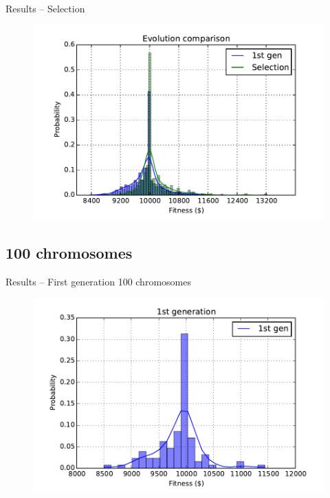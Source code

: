 \documentclass[12pt,portuguese]{beamer}
\begin{document}
\begin{frame}{Results -- Selection}
	\begin{figure}[h]
	\centering
	\includegraphics[width=0.9\columnwidth]{images/01r_1000_sel.pdf}
	\end{figure}
\end{frame}

\subsection{100 chromosomes}
\begin{frame}{Results -- First generation 100 chromosomes}
	\begin{figure}[h]
	\centering
	\includegraphics[width=0.9\columnwidth]{images/01r_100.pdf}
	\end{figure}
\end{frame}
\end{document}
